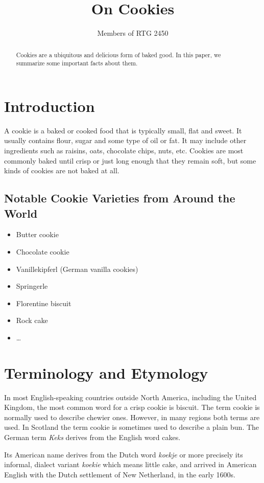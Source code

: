 \documentclass[a4paper]{article}
\title{On Cookies}
\author{Members of RTG 2450}
\begin{document}
\maketitle

\begin{abstract}
	Cookies are a ubiquitous and delicious form of baked good. 
	In this paper, we summarize some important facts about them.
\end{abstract}

\section{Introduction}
A cookie is a baked or cooked food that is typically small, flat and sweet. 
It usually contains flour, sugar and some type of oil or fat. 
It may include other ingredients such as raisins, oats, chocolate chips, nuts, etc. 
Cookies are most commonly baked until crisp or just long enough that they remain soft, but some kinds of cookies are not baked at all.

\subsection{Notable Cookie Varieties from Around the World}
\begin{itemize}
	\item Butter cookie
	\item Chocolate cookie
	\item Vanillekipferl (German vanilla cookies)
	\item Springerle
	\item Florentine biscuit
	\item Rock cake
	\item \dots
\end{itemize}

\section{Terminology and Etymology}
In most English-speaking countries outside North America, including the United Kingdom, the most common word for a crisp cookie is biscuit. 
The term cookie is normally used to describe chewier ones. 
However, in many regions both terms are used. 
In Scotland the term cookie is sometimes used to describe a plain bun. 
The German term \textit{Keks} derives from the English word cakes.

Its American name derives from the Dutch word \textit{koekje} or more precisely its informal, dialect variant \textit{koekie} which means little cake, and arrived in American English with the Dutch settlement of New Netherland, in the early 1600s.
\end{document}

